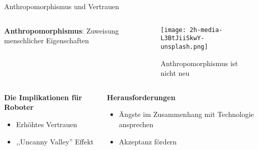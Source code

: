 \documentclass[aspectratio=169]{beamer}
\begin{document}
\begin{frame}{Anthropomorphismus und Vertrauen}
  \begin{columns}
    \begin{column}{.5\textwidth}
      \textbf{Anthropomorphismus}: Zuweisung menschlicher Eigenschaften
    \end{column}
    \begin{column}{.5\textwidth}
      \begin{figure}[h]
        \centering
        \texttt{[image: 2h-media-L3BtJiiSkwY-unsplash.png]}
        \caption{Anthropomorphismus ist nicht neu}
      \end{figure}
    \end{column}
  \end{columns}

  \begin{columns}
    \begin{column}{.5\textwidth}
      \textbf{Die Implikationen für Roboter}
      \begin{itemize}
        \item Erhöhtes Vertrauen
        \item ,,Uncanny Valley'' Effekt
      \end{itemize}
    \end{column}
    \begin{column}{.5\textwidth}
      \textbf{Herausforderungen}
      \begin{itemize}
        \item Ängste im Zusammenhang mit Technologie ansprechen
        \item Akzeptanz fördern
      \end{itemize}
    \end{column}
  \end{columns}

\end{frame}
\end{document}
